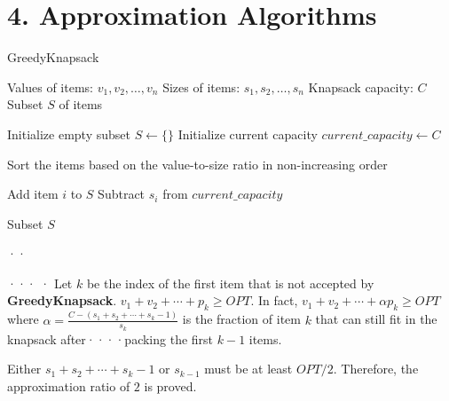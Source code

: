 \documentclass[10pt]{article}
\begin{document}
\section*{4. Approximation Algorithms}

\begin{algorithm}
  \caption{GreedyKnapsack}
  \begin{algorithmic}[1]
    \Require Values of items: $v_1, v_2, \ldots, v_n$
    \Require Sizes of items: $s_1, s_2, \ldots, s_n$
    \Require Knapsack capacity: $C$
    \Ensure Subset $S$ of items

    \State Initialize empty subset $S \gets \{\}$
    \State Initialize current capacity $current\_capacity \gets C$

    \State Sort the items based on the value-to-size ratio in non-increasing order

    \State Add item $i$ to $S$
    \State Subtract $s_i$ from $current\_capacity$
    \EndIf
    \EndFor

    \State \Return Subset $S$
  \end{algorithmic}··
\end{algorithm}···
·
Let $k$ be the index of the first item that is not accepted by \textbf{GreedyKnapsack}. $v_1 +v_2 + \cdots + p_k \geq OPT$. In fact,  $v_1 +v_2 + \cdots + \alpha p_k \geq OPT$ where $\alpha = \frac{C-(s_1+s_2+ \cdots +s_k-1)}{s_k}$
is the fraction of item $k$ that can still fit in the knapsack after····packing the first $k - 1$ items.

Either $s_1+s_2+ \cdots +s_k-1$ or $s_{k-1}$ must be at least $OPT/2$. Therefore, the approximation ratio of $2$ is proved.
\end{document}
